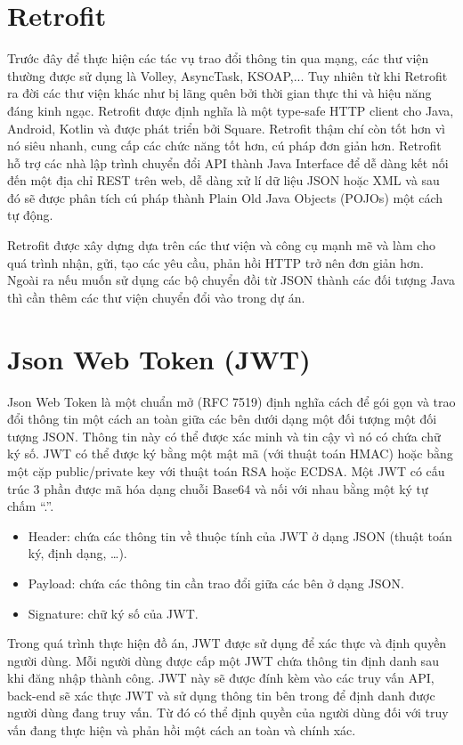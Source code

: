 \documentclass[../Main.tex]{subfiles}
\begin{document}
\section{Retrofit}
Trước đây để thực hiện các tác vụ trao đổi thông tin qua mạng, các thư viện thường được sử dụng là Volley, AsyncTask, KSOAP,... Tuy nhiên từ khi Retrofit ra đời các thư viện khác như bị lãng quên bởi thời gian thực thi và hiệu năng đáng kinh ngạc.
Retrofit \cite{Retrofit2} được định nghĩa là một type-safe HTTP client cho Java, Android, Kotlin và được phát triển bởi Square. Retrofit thậm chí còn tốt hơn vì nó siêu nhanh, cung cấp các chức năng tốt hơn, cú pháp đơn giản hơn. Retrofit hỗ trợ các nhà lập trình chuyển đổi API thành Java Interface để dễ dàng kết nối đến một địa chỉ REST trên web, dễ dàng xử lí dữ liệu JSON hoặc XML và sau đó sẽ được phân tích cú pháp thành Plain Old Java Objects (POJOs) một cách tự động. 

Retrofit được xây dựng dựa trên các thư viện và công cụ mạnh mẽ và làm cho quá trình nhận, gửi, tạo các yêu cầu, phản hồi HTTP trở  nên đơn giản hơn. Ngoài ra nếu muốn sử dụng các bộ chuyển đồi từ JSON thành các đối tượng Java thì cần thêm các thư viện chuyển đổi vào trong dự án.

\section{Json Web Token (JWT)}
Json Web Token \cite{Jwt1} là một chuẩn mở (RFC 7519)  định nghĩa cách để gói gọn và trao đổi thông tin một cách an toàn giữa các bên dưới dạng một đối tượng một đối tượng JSON. Thông tin này có thể được xác minh và tin cậy vì nó có chứa chữ ký số. JWT có thể được ký bằng một mật mã (với thuật toán HMAC) hoặc bằng một cặp public/private key với thuật toán RSA hoặc ECDSA. Một JWT có cấu trúc 3 phần được mã hóa dạng chuỗi Base64 và nối với nhau bằng một ký tự chấm “.”.
\begin{itemize}
    \item Header: chứa các thông tin về thuộc tính của JWT ở dạng JSON (thuật toán ký, định dạng, …).
    \item Payload: chứa các thông tin cần trao đổi giữa các bên ở dạng JSON.
    \item Signature: chữ ký số của JWT.
\end{itemize}

Trong quá trình thực hiện đồ án, JWT được sử dụng để xác thực và định quyền người dùng. Mỗi người dùng được cấp một JWT chứa thông tin định danh sau khi đăng nhập thành công. JWT này sẽ được đính kèm vào các truy vấn API, back-end sẽ xác thực JWT và sử dụng thông tin bên trong để định danh được người dùng đang truy vấn. Từ đó có thể định quyền của người dùng đối với truy vấn đang thực hiện và phản hồi một cách an toàn và chính xác.   
\end{document}
